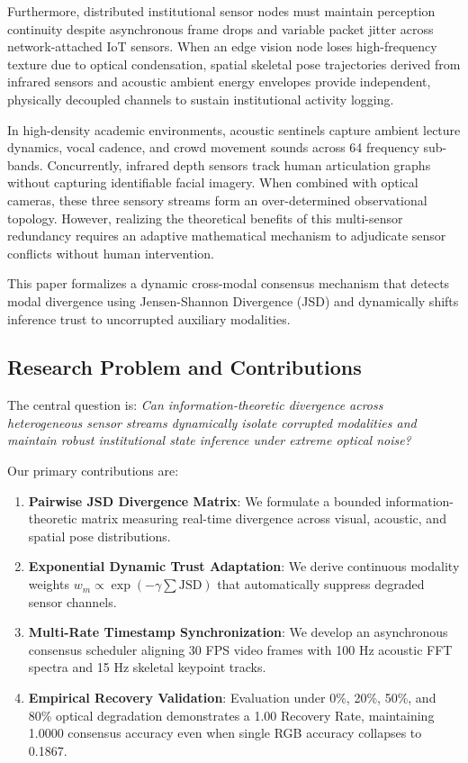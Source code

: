 \documentclass[conference]{IEEEtran}
\begin{document}
Furthermore, distributed institutional sensor nodes must maintain perception continuity despite asynchronous frame drops and variable packet jitter across network-attached IoT sensors. When an edge vision node loses high-frequency texture due to optical condensation, spatial skeletal pose trajectories derived from infrared sensors and acoustic ambient energy envelopes provide independent, physically decoupled channels to sustain institutional activity logging.

In high-density academic environments, acoustic sentinels capture ambient lecture dynamics, vocal cadence, and crowd movement sounds across 64 frequency sub-bands. Concurrently, infrared depth sensors track human articulation graphs without capturing identifiable facial imagery. When combined with optical cameras, these three sensory streams form an over-determined observational topology. However, realizing the theoretical benefits of this multi-sensor redundancy requires an adaptive mathematical mechanism to adjudicate sensor conflicts without human intervention.

This paper formalizes a dynamic cross-modal consensus mechanism that detects modal divergence using Jensen-Shannon Divergence (JSD) and dynamically shifts inference trust to uncorrupted auxiliary modalities.

\subsection{Research Problem and Contributions}
The central question is: \textit{Can information-theoretic divergence across heterogeneous sensor streams dynamically isolate corrupted modalities and maintain robust institutional state inference under extreme optical noise?}

Our primary contributions are:
\begin{enumerate}
    \item \textbf{Pairwise JSD Divergence Matrix}: We formulate a bounded information-theoretic matrix measuring real-time divergence across visual, acoustic, and spatial pose distributions.
    \item \textbf{Exponential Dynamic Trust Adaptation}: We derive continuous modality weights $w_m \propto \exp(-\gamma \sum \text{JSD})$ that automatically suppress degraded sensor channels.
    \item \textbf{Multi-Rate Timestamp Synchronization}: We develop an asynchronous consensus scheduler aligning 30 FPS video frames with 100 Hz acoustic FFT spectra and 15 Hz skeletal keypoint tracks.
    \item \textbf{Empirical Recovery Validation}: Evaluation under 0\%, 20\%, 50\%, and 80\% optical degradation demonstrates a 1.00 Recovery Rate, maintaining 1.0000 consensus accuracy even when single RGB accuracy collapses to 0.1867.
\end{enumerate}
\end{document}
